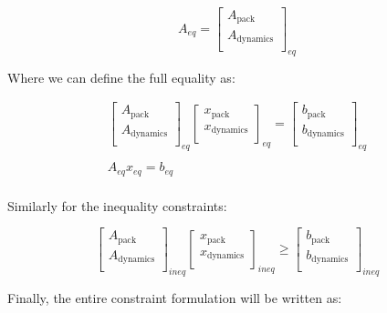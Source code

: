 \documentclass[letterpaper, 10pt, conference]{IEEEtran}
\begin{document}
\[
A_{eq} =
\begin{bmatrix}
    A_{\textrm{pack}}     \\
    A_{\textrm{dynamics}} \\
\end{bmatrix}_{eq}
\]

Where we can define the full equality as:

\[
\begin{array}{c}
    \begin{bmatrix}
        A_{\textrm{pack}}     \\
        A_{\textrm{dynamics}} \\
    \end{bmatrix}_{eq}
    \begin{bmatrix}
        x_{\textrm{pack}}     \\
        x_{\textrm{dynamics}} \\
    \end{bmatrix}_{eq} =
    \begin{bmatrix}
        b_{\textrm{pack}}     \\
        b_{\textrm{dynamics}} \\
    \end{bmatrix}_{eq} \\
    \\
    A_{eq} x_{eq} = b_{eq} \\
\end{array}
\]

Similarly for the inequality constraints:

\[
\begin{bmatrix}
    A_{\textrm{pack}}     \\
    A_{\textrm{dynamics}} \\
\end{bmatrix}_{ineq}
\begin{bmatrix}
    x_{\textrm{pack}}     \\
    x_{\textrm{dynamics}} \\
\end{bmatrix}_{ineq} \geq
\begin{bmatrix}
    b_{\textrm{pack}}     \\
    b_{\textrm{dynamics}} \\
\end{bmatrix}_{ineq}
\]

Finally, the entire constraint formulation will be written as:
\end{document}
